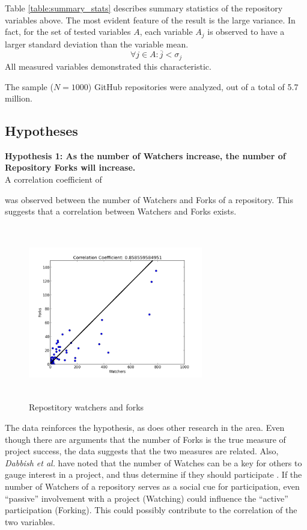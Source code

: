 \documentclass{proc}
\begin{document}
{{{{{{{Table \ref{table:summary_stats} describes summary statistics of the repository variables above. The most evident feature of the result is the large variance. In fact, for the set of tested variables $A$, each variable $A_j$ is observed to have a larger standard deviation than the variable mean.
\begin{equation}
\forall j \in A \colon \overline{j} < \sigma_{j}
\label{eq:variance}
\end{equation}
All measured variables demonstrated this characteristic.

The sample ($N = 1000$) GitHub repositories were analyzed, out of a total of 5.7 million\cite{githubPress}.

\subsection{Hypotheses}
\noindent \textbf{Hypothesis 1: As the number of Watchers increase, the number of Repository Forks will increase.}\\
A correlation coefficient of }\unskip was observed between the number of Watchers and Forks of a repository. This suggests that a correlation between Watchers and Forks exists.

\begin{figure}
\includegraphics[height=3in,width=3in]{images/watcher_forks_scatterplot.png}
\caption{Repostitory watchers and forks}
\end{figure}

The data reinforces the hypothesis, as does other research in the area. Even though there are arguments that the number of Forks is the true measure of project success\cite{baudry2012towards}, the data suggests that the two measures are related. Also, \textit{Dabbish et al.} have noted that the number of Watches can be a key for others to gauge interest in a project, and thus determine if they should participate \cite{dabbish2013leveraging}. If the number of Watchers of a repository serves as a social cue for participation, even ``passive'' involvement with a project (Watching) could influence the ``active'' participation (Forking). This could possibly contribute to the correlation of the two variables.\\

}}}}}}
\end{document}
